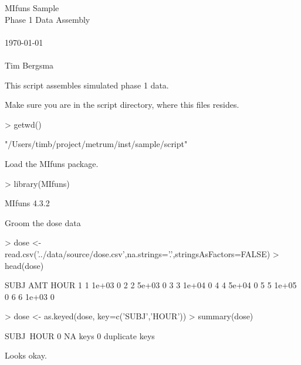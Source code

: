 
\usepackage{Sweave}

 

\vspace*{2cm}
\begin{center}
{\Large MIfuns Sample}\\
\vspace{1.5cm}
{\Large Phase 1 Data Assembly}\\
~\\
\today\\
~\\
Tim Bergsma\\
\end{center}
\newpage

This script assembles simulated phase 1 data.

Make sure you are in the script directory, where this files resides.
\begin{Schunk}
\begin{Sinput}
> getwd()
\end{Sinput}
\begin{Soutput}
[1] "/Users/timb/project/metrum/inst/sample/script"
\end{Soutput}
\end{Schunk}
Load the MIfuns package.
\begin{Schunk}
\begin{Sinput}
> library(MIfuns)
\end{Sinput}
\begin{Soutput}
MIfuns 4.3.2 
\end{Soutput}
\end{Schunk}
Groom the dose data
\begin{Schunk}
\begin{Sinput}
> dose <- read.csv('../data/source/dose.csv',na.strings='.',stringsAsFactors=FALSE)
> head(dose)
\end{Sinput}
\begin{Soutput}
  SUBJ   AMT HOUR
1    1 1e+03    0
2    2 5e+03    0
3    3 1e+04    0
4    4 5e+04    0
5    5 1e+05    0
6    6 1e+03    0
\end{Soutput}
\begin{Sinput}
> dose <- as.keyed(dose, key=c('SUBJ','HOUR'))
> summary(dose)
\end{Sinput}
\begin{Soutput}
SUBJ~HOUR
0 NA keys
0 duplicate keys
\end{Soutput}
\end{Schunk}
Looks okay.

